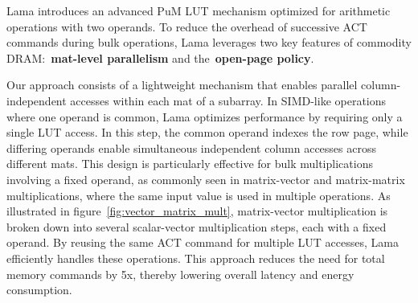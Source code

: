 Lama introduces an advanced PuM LUT mechanism optimized for arithmetic operations with two operands. To reduce the overhead of successive ACT commands during bulk operations, Lama leverages two key features of commodity DRAM:~\textbf{mat-level parallelism} and the~\textbf{open-page policy}.

Our approach consists of a lightweight mechanism that enables parallel column-independent accesses within each mat of a subarray. In SIMD-like operations where one operand is common, Lama optimizes performance by requiring only a single LUT access. In this step, the common operand indexes the row page, while differing operands enable simultaneous independent column accesses across different mats. This design is particularly effective for bulk multiplications involving a fixed operand, as commonly seen in matrix-vector and matrix-matrix multiplications, where the same input value is used in multiple operations.
As illustrated in figure~\ref{fig:vector_matrix_mult}, matrix-vector multiplication is broken down into several scalar-vector multiplication steps, each with a fixed operand. By reusing the same ACT command for multiple LUT accesses, Lama efficiently handles these operations. This approach reduces the need for total memory commands by 5x, thereby lowering overall latency and energy consumption. 



